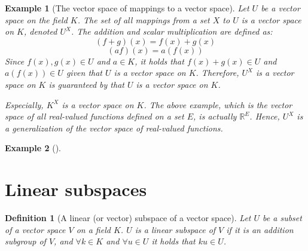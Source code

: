 \documentclass[onecolumn]{ctexart}
\newtheorem{definition}{Definition}
\newtheorem{example}{Example}
\begin{document}
\begin{example}[The vector space of mappings to a vector space]
  Let $U$ be a vector space on the field $K$. The set of all mappings from a set 
  $X$ to $U$ is a vector space on $K$, denoted $U^X$. The addition and scalar 
  multiplication are defined as:
  \[
    (f + g)(x) = f(x) + g(x)
  \]
  \[
    (af)(x) = a(f(x))
  \]
  Since $f(x), g(x) \in U$ and $a \in K$, it holds that $f(x) + g(x) \in U$ and 
  $a(f(x)) \in U$ given that $U$ is a vector space on $K$. Therefore, $U^X$ is a 
  vector space on $K$ is guaranteed by that $U$ is a vector space on $K$.

  Especially, $K^X$ is a vector space on $K$. The above example, which is the 
  vector space of all real-valued functions defined on a set $E$, is actually 
  $\mathbb{R}^E$. Hence, $U^X$ is a generalization of the vector space of 
  real-valued functions.
\end{example}

\begin{example}[]
  
\end{example}

\section{Linear subspaces}

\begin{definition}[A linear (or vector) subspace of a vector space]
  Let $U$ be a subset of a vector space $V$ on a field $K$. $U$ is a linear subspace 
  of $V$ if it is an addition subgroup of $V$, and $\forall k \in K$ and $\forall 
  u \in U$ it holds that $ku \in U$.
\end{definition}
\end{document}

